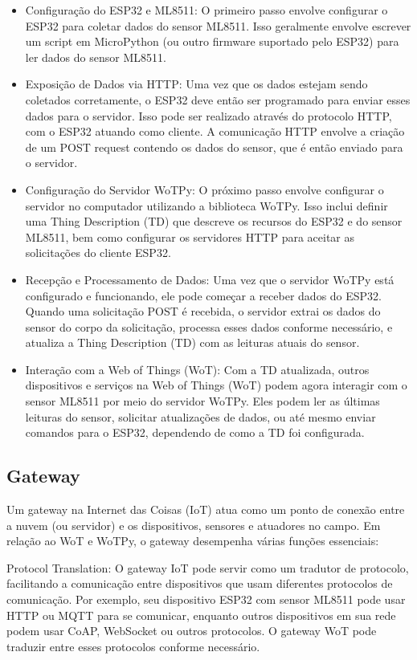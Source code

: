 \begin{itemize}
    \item Configuração do ESP32 e ML8511: O primeiro passo envolve configurar o ESP32 para coletar dados do sensor ML8511. Isso geralmente envolve escrever um script em MicroPython (ou outro firmware suportado pelo ESP32) para ler dados do sensor ML8511.
    \item Exposição de Dados via HTTP: Uma vez que os dados estejam sendo coletados corretamente, o ESP32 deve então ser programado para enviar esses dados para o servidor. Isso pode ser realizado através do protocolo HTTP, com o ESP32 atuando como cliente. A comunicação HTTP envolve a criação de um POST request contendo os dados do sensor, que é então enviado para o servidor.
    \item Configuração do Servidor WoTPy: O próximo passo envolve configurar o servidor no computador utilizando a biblioteca WoTPy. Isso inclui definir uma Thing Description (TD) que descreve os recursos do ESP32 e do sensor ML8511, bem como configurar os servidores HTTP para aceitar as solicitações do cliente ESP32.
    \item Recepção e Processamento de Dados: Uma vez que o servidor WoTPy está configurado e funcionando, ele pode começar a receber dados do ESP32. Quando uma solicitação POST é recebida, o servidor extrai os dados do sensor do corpo da solicitação, processa esses dados conforme necessário, e atualiza a Thing Description (TD) com as leituras atuais do sensor.
    \item Interação com a Web of Things (WoT): Com a TD atualizada, outros dispositivos e serviços na Web of Things (WoT) podem agora interagir com o sensor ML8511 por meio do servidor WoTPy. Eles podem ler as últimas leituras do sensor, solicitar atualizações de dados, ou até mesmo enviar comandos para o ESP32, dependendo de como a TD foi configurada.
\end{itemize}

\subsection{Gateway}

Um gateway na Internet das Coisas (IoT) atua como um ponto de conexão entre a nuvem (ou servidor) e os dispositivos, sensores e atuadores no campo. Em relação ao WoT e WoTPy, o gateway desempenha várias funções essenciais:

Protocol Translation: O gateway IoT pode servir como um tradutor de protocolo, facilitando a comunicação entre dispositivos que usam diferentes protocolos de comunicação. Por exemplo, seu dispositivo ESP32 com sensor ML8511 pode usar HTTP ou MQTT para se comunicar, enquanto outros dispositivos em sua rede podem usar CoAP, WebSocket ou outros protocolos. O gateway WoT pode traduzir entre esses protocolos conforme necessário.

